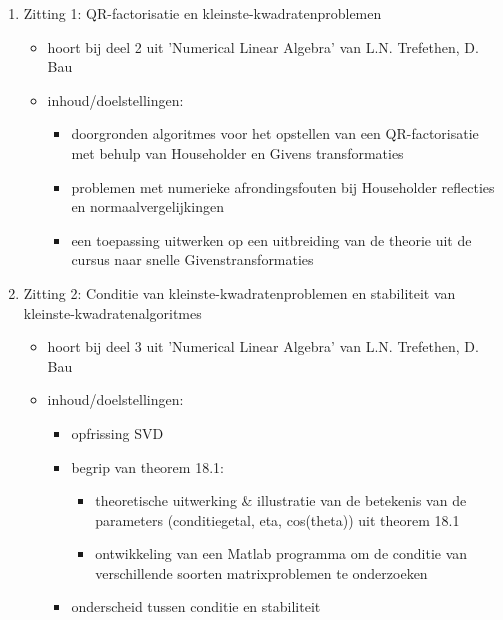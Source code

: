 \begin{enumerate}
	\item Zitting 1: QR-factorisatie en kleinste-kwadratenproblemen
	      \begin{itemize}
		      \item hoort bij deel 2 uit 'Numerical Linear Algebra' van L.N. Trefethen, D. Bau
		      \item inhoud/doelstellingen:
		            \begin{itemize}
			            \item doorgronden algoritmes voor het opstellen van een QR-factorisatie met behulp van Householder en Givens transformaties
			            \item problemen met numerieke afrondingsfouten bij Householder reflecties en normaalvergelijkingen
			            \item een toepassing uitwerken op een uitbreiding van de theorie uit de cursus naar snelle Givenstransformaties
		            \end{itemize}
	      \end{itemize}

	\item Zitting 2: Conditie van kleinste-kwadratenproblemen en stabiliteit van kleinste-kwadratenalgoritmes
	      \begin{itemize}
		      \item hoort bij deel 3 uit 'Numerical Linear Algebra' van L.N. Trefethen, D. Bau
		      \item inhoud/doelstellingen:
		            \begin{itemize}
			            \item opfrissing SVD
			            \item begrip van theorem 18.1:
			                  \begin{itemize}
				                  \item theoretische uitwerking \& illustratie van de betekenis van de parameters (conditiegetal, eta, cos(theta)) uit theorem 18.1
				                  \item ontwikkeling van een Matlab programma om de conditie van verschillende soorten matrixproblemen te onderzoeken
			                  \end{itemize}
			            \item onderscheid tussen conditie en stabiliteit
		            \end{itemize}
	      \end{itemize}


\end{enumerate}
